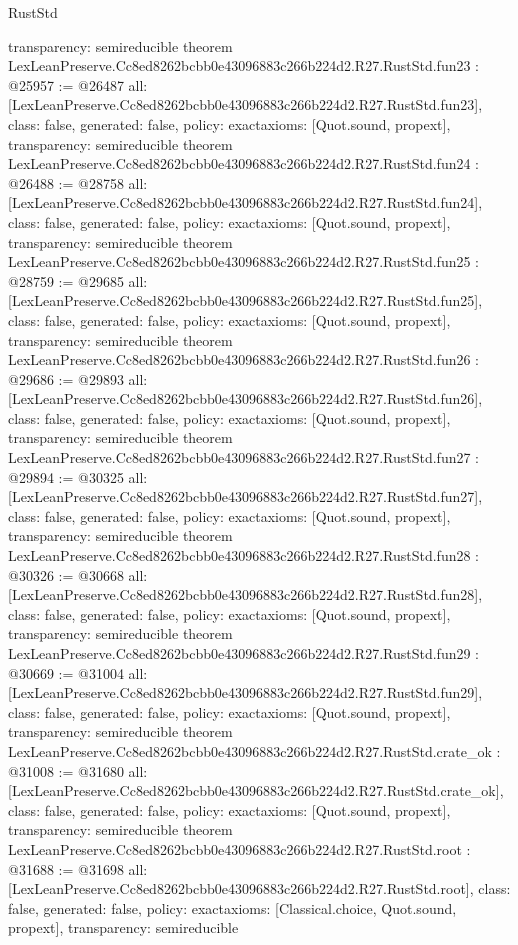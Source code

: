 \begin{lexlean}{RustStd}
\begin{coremodule}
{  transparency: semireducible
}
theorem LexLeanPreserve.Cc8ed8262bcbb0e43096883c266b224d2.R27.RustStd.fun23 : @25957 := @26487 {
  all: [LexLeanPreserve.Cc8ed8262bcbb0e43096883c266b224d2.R27.RustStd.fun23],
  class: false,
  generated: false,
  policy: exact{axioms: [Quot.sound, propext]},
  transparency: semireducible
}
theorem LexLeanPreserve.Cc8ed8262bcbb0e43096883c266b224d2.R27.RustStd.fun24 : @26488 := @28758 {
  all: [LexLeanPreserve.Cc8ed8262bcbb0e43096883c266b224d2.R27.RustStd.fun24],
  class: false,
  generated: false,
  policy: exact{axioms: [Quot.sound, propext]},
  transparency: semireducible
}
theorem LexLeanPreserve.Cc8ed8262bcbb0e43096883c266b224d2.R27.RustStd.fun25 : @28759 := @29685 {
  all: [LexLeanPreserve.Cc8ed8262bcbb0e43096883c266b224d2.R27.RustStd.fun25],
  class: false,
  generated: false,
  policy: exact{axioms: [Quot.sound, propext]},
  transparency: semireducible
}
theorem LexLeanPreserve.Cc8ed8262bcbb0e43096883c266b224d2.R27.RustStd.fun26 : @29686 := @29893 {
  all: [LexLeanPreserve.Cc8ed8262bcbb0e43096883c266b224d2.R27.RustStd.fun26],
  class: false,
  generated: false,
  policy: exact{axioms: [Quot.sound, propext]},
  transparency: semireducible
}
theorem LexLeanPreserve.Cc8ed8262bcbb0e43096883c266b224d2.R27.RustStd.fun27 : @29894 := @30325 {
  all: [LexLeanPreserve.Cc8ed8262bcbb0e43096883c266b224d2.R27.RustStd.fun27],
  class: false,
  generated: false,
  policy: exact{axioms: [Quot.sound, propext]},
  transparency: semireducible
}
theorem LexLeanPreserve.Cc8ed8262bcbb0e43096883c266b224d2.R27.RustStd.fun28 : @30326 := @30668 {
  all: [LexLeanPreserve.Cc8ed8262bcbb0e43096883c266b224d2.R27.RustStd.fun28],
  class: false,
  generated: false,
  policy: exact{axioms: [Quot.sound, propext]},
  transparency: semireducible
}
theorem LexLeanPreserve.Cc8ed8262bcbb0e43096883c266b224d2.R27.RustStd.fun29 : @30669 := @31004 {
  all: [LexLeanPreserve.Cc8ed8262bcbb0e43096883c266b224d2.R27.RustStd.fun29],
  class: false,
  generated: false,
  policy: exact{axioms: [Quot.sound, propext]},
  transparency: semireducible
}
theorem LexLeanPreserve.Cc8ed8262bcbb0e43096883c266b224d2.R27.RustStd.crate_ok : @31008 := @31680 {
  all: [LexLeanPreserve.Cc8ed8262bcbb0e43096883c266b224d2.R27.RustStd.crate_ok],
  class: false,
  generated: false,
  policy: exact{axioms: [Quot.sound, propext]},
  transparency: semireducible
}
theorem LexLeanPreserve.Cc8ed8262bcbb0e43096883c266b224d2.R27.RustStd.root : @31688 := @31698 {
  all: [LexLeanPreserve.Cc8ed8262bcbb0e43096883c266b224d2.R27.RustStd.root],
  class: false,
  generated: false,
  policy: exact{axioms: [Classical.choice, Quot.sound, propext]},
  transparency: semireducible
}


\end{coremodule}
\end{lexlean}
